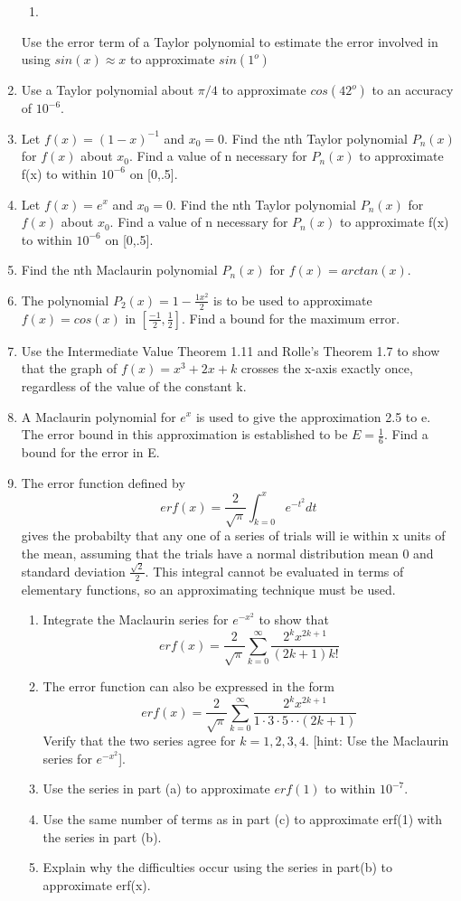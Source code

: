 \documentclass{article}
\begin{document}
\begin{enumerate}
    \begin{enumerate}
        \item 
    \end{enumerate}
    Use the error term of a Taylor polynomial to estimate the error involved in using $sin(x) \approx x$ to approximate $sin(1^o)$
    \item Use a Taylor polynomial about $\pi/4$ to approximate $cos(42^o)$ to an accuracy of $10^{-6}$.
    \item Let $f(x) = (1-x)^{-1}$ and $x_0 = 0$. Find the nth Taylor polynomial $P_n(x)$ for $f(x)$ about $x_0$. Find a value of n necessary for $P_n(x)$ to approximate f(x) to within $10^{-6}$ on [0,.5].
    \item Let $f(x) = e^x$ and $x_0 = 0$. Find the nth Taylor polynomial $P_n(x)$ for $f(x)$ about $x_0$. Find a value of n necessary for $P_n(x)$ to approximate f(x) to within $10^{-6}$ on [0,.5].
    \item Find the nth Maclaurin polynomial $P_n(x)$ for $f(x) = arctan(x)$.
    \item The polynomial $P_2(x) = 1 - \frac{1x^2}{2}$ is to be used to approximate $f(x) = cos(x)$ in $[\frac{-1}{2},\frac{1}{2}]$. Find a bound for the maximum error. 
    \item Use the Intermediate Value Theorem 1.11 and Rolle's Theorem 1.7 to show that the graph of $f(x) = x^3 + 2x + k$ crosses the x-axis exactly once, regardless of the value of the constant k.
    \item A Maclaurin polynomial for $e^x$ is used to give the approximation 2.5 to e. The error bound in this approximation is established to be $E=\frac{1}{6}$. Find a bound for the error in E.
    \item The error function defined by
        $$erf(x) = \frac{2}{\sqrt{\pi}}\int_{k=0}^{x}e^{-t^2}dt$$
    gives the probabilty that any one of a series of trials will ie within x units of the mean, assuming that the trials have a normal distribution mean 0 and standard deviation $\frac{\sqrt{2}}{2}$. This integral cannot be evaluated in terms of elementary functions, so an approximating technique must be used. 
    \begin{enumerate}
        \item Integrate the Maclaurin series for $e^{-x^2}$ to show that
        $$erf(x) = \frac{2}{\sqrt{\pi}}\sum_{k=0}^{\infty}\frac{2^{k}x^{2k+1}}{(2k+1)k!}$$
        \item The error function can also be expressed in the form
        $$erf(x) = \frac{2}{\sqrt{\pi}}\sum_{k=0}^{\infty}\frac{2^{k}x^{2k+1}}{1\cdot3\cdot5\cdot\cdot(2k+1)}$$
        Verify that the two series agree for $k = 1,2,3, 4$. [hint: Use the Maclaurin series for $e^{-x^2}$].
        \item Use the series in part (a) to approximate $erf(1)$ to within $10^{-7}$.
        \item Use the same number of terms as in part (c) to approximate erf(1) with the series in part (b).
        \item Explain why the difficulties occur using the series in part(b) to approximate erf(x).
    \end{enumerate}
\end{enumerate}
\end{document}
